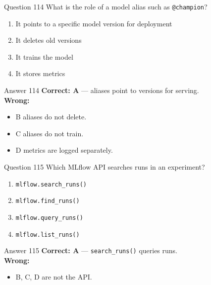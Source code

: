\documentclass[aspectratio=169,11pt]{beamer}
\begin{document}
	\begin{frame}{Question 114}
		What is the role of a model alias such as \texttt{@champion}?
		\begin{enumerate}[label=\Alph*.]
			\item It points to a specific model version for deployment
			\item It deletes old versions
			\item It trains the model
			\item It stores metrics
		\end{enumerate}
	\end{frame}
	\begin{frame}{Answer 114}
		\textbf{Correct: A} --- aliases point to versions for serving.\\
		\vspace{0.5em}
		\textbf{Wrong:}
		\begin{itemize}
			\item B aliases do not delete.
			\item C aliases do not train.
			\item D metrics are logged separately.
		\end{itemize}
	\end{frame}
	
	\begin{frame}{Question 115}
		Which MLflow API searches runs in an experiment?
		\begin{enumerate}[label=\Alph*.]
			\item \texttt{mlflow.search\_runs()}
			\item \texttt{mlflow.find\_runs()}
			\item \texttt{mlflow.query\_runs()}
			\item \texttt{mlflow.list\_runs()}
		\end{enumerate}
	\end{frame}
	\begin{frame}{Answer 115}
		\textbf{Correct: A} --- \texttt{search\_runs()} queries runs.\\
		\vspace{0.5em}
		\textbf{Wrong:}
		\begin{itemize}
			\item B, C, D are not the API.
		\end{itemize}
	\end{frame}
	
\end{document}
